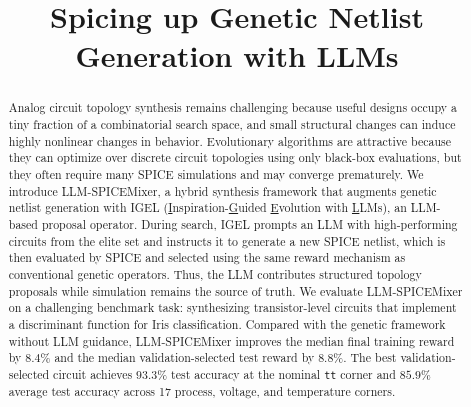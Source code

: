 \documentclass[sigconf,pbalance]{acmart_modified}
\newcommand{\squeezeSection}{}
\newcommand{\llmspm}{LLM-SPICE\-Mixer}
\begin{document}
\title{Spicing up Genetic Netlist Generation with LLMs}


\begin{abstract}
Analog circuit topology synthesis remains challenging because useful designs occupy a tiny fraction of a combinatorial search space, and small structural changes can induce highly nonlinear changes in behavior. Evolutionary algorithms are attractive because they can optimize over discrete circuit topologies using only black-box evaluations, but they often require many SPICE simulations and may converge prematurely. We introduce \llmspm{}, a hybrid synthesis framework that augments genetic netlist generation with IGEL (\underline{I}nspiration-\underline{G}uided \underline{E}volution with \underline{L}LMs), an LLM-based proposal operator. During search, IGEL prompts an LLM with high-performing circuits from the elite set and instructs it to generate a new SPICE netlist, which is then evaluated by SPICE and selected using the same reward mechanism as conventional genetic operators. Thus, the LLM contributes structured topology proposals while simulation remains the source of truth. We evaluate \llmspm{} on a challenging benchmark task: synthesizing transistor-level circuits that implement a discriminant function for Iris classification. Compared with the genetic framework without LLM guidance, \llmspm{} improves the median final training reward by $8.4\%$ and the median validation-selected test reward by $8.8\%$. The best validation-selected circuit achieves $93.3\%$ test accuracy at the nominal \texttt{tt} corner and $85.9\%$ average test accuracy across 17 process, voltage, and temperature corners.
\squeezeSection
\end{abstract}
\end{document}
